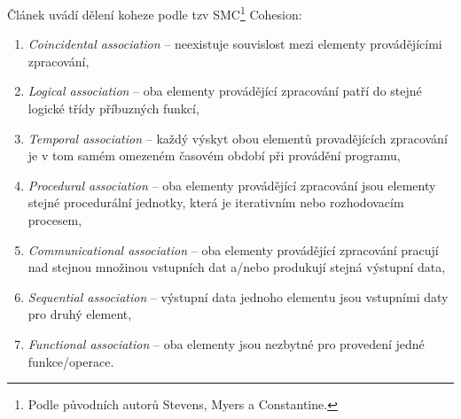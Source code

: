 \noindent{}Článek \cite{ISI:000079726000029} uvádí dělení koheze podle tzv SMC\footnote{Podle původních autorů Stevens, Myers a Constantine.} Cohesion:
\begin{enumerate}
\item \emph{Coincidental association} -- neexistuje souvislost mezi elementy provádějícími zpracování,
\item \emph{Logical association} -- oba elementy provádějící zpracování patří do stejné logické třídy příbuzných funkcí,
\item \emph{Temporal association} -- každý výskyt obou elementů provadějících zpracování je v tom samém omezeném časovém období při provádění programu,
\item \emph{Procedural association} -- oba elementy provádějící zpracování jsou elementy stejné procedurální jednotky, která je iterativním nebo rozhodovacím procesem,
\item \emph{Communicational association} -- oba elementy provádějící zpracování pracují nad stejnou množinou vstupních dat a/nebo produkují stejná výstupní data,
\item \emph{Sequential association} -- výstupní data jednoho elementu jsou vstupními daty pro druhý element,
\item \emph{Functional association} -- oba elementy jsou nezbytné pro provedení jedné funkce/operace.
\end{enumerate}

